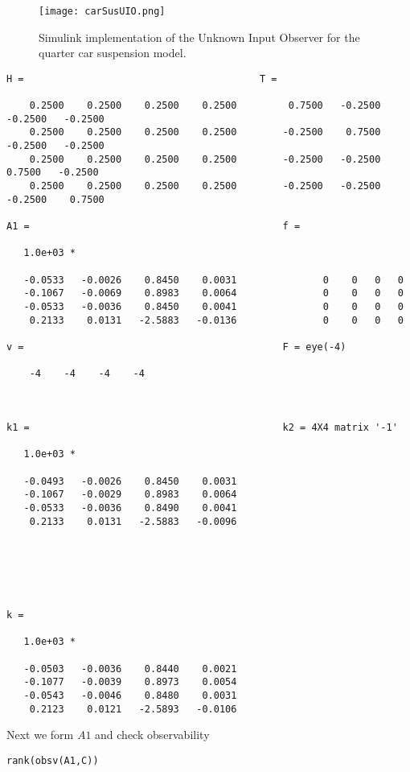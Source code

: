 \documentclass{amsart}
\theoremstyle{definition}
\theoremstyle{remark}
\numberwithin{equation}{section}
\begin{document}
\begin{figure}[H]
    \centering
    \texttt{[image: carSusUIO.png]}
    \caption{Simulink implementation of the Unknown Input Observer for the quarter car suspension model.}
    \label{fig:carSusUIO}
\end{figure}
        \color{lightgray} \begin{verbatim}
H =                                         T = 

    0.2500    0.2500    0.2500    0.2500         0.7500   -0.2500   -0.2500   -0.2500
    0.2500    0.2500    0.2500    0.2500        -0.2500    0.7500   -0.2500   -0.2500
    0.2500    0.2500    0.2500    0.2500        -0.2500   -0.2500    0.7500   -0.2500
    0.2500    0.2500    0.2500    0.2500        -0.2500   -0.2500   -0.2500    0.7500

A1 =                                            f = 

   1.0e+03 *

   -0.0533   -0.0026    0.8450    0.0031               0    0   0   0
   -0.1067   -0.0069    0.8983    0.0064               0    0   0   0
   -0.0533   -0.0036    0.8450    0.0041               0    0   0   0
    0.2133    0.0131   -2.5883   -0.0136               0    0   0   0

v =                                             F = eye(-4)

    -4    -4    -4    -4
    
    

k1 =                                            k2 = 4X4 matrix '-1'

   1.0e+03 *

   -0.0493   -0.0026    0.8450    0.0031
   -0.1067   -0.0029    0.8983    0.0064
   -0.0533   -0.0036    0.8490    0.0041
    0.2133    0.0131   -2.5883   -0.0096






k =

   1.0e+03 *

   -0.0503   -0.0036    0.8440    0.0021
   -0.1077   -0.0039    0.8973    0.0054
   -0.0543   -0.0046    0.8480    0.0031
    0.2123    0.0121   -2.5893   -0.0106

\end{verbatim} \color{black}
    


Next we form $A1$ and check observability

\begin{verbatim}
rank(obsv(A1,C))
\end{verbatim}
\end{document}
